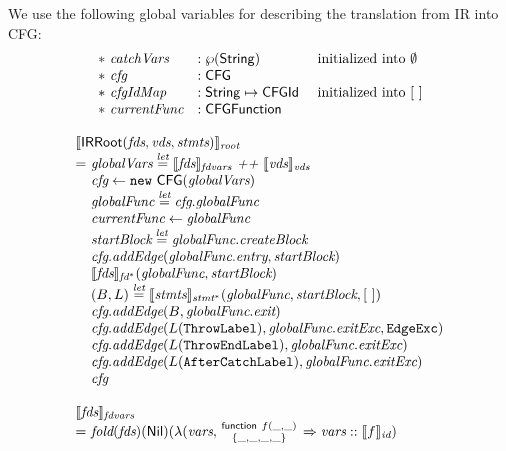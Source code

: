 We use the following global variables for describing the translation from IR into CFG:
\[
\begin{array}{lll}
*\ \emph{catchVars} &: \wp(\mbox{\textsf{String}}) & \text{ initialized into } \emptyset\\
*\ \emph{cfg} &: \mbox{\textsf{CFG}} &\\
*\ \emph{cfgIdMap} &: \mbox{\textsf{String}} \mapsto \mbox{\textsf{CFGId}} & \text{ initialized into } [\ ]\\
*\ \emph{currentFunc} &: \mbox{\textsf{CFGFunction}} & \\
\end{array}
\]

\[
\begin{array}{l@{}l@{~}l}
\lefteqn{\transfun{\IRRoot(\emph{fds}, \emph{vds}, \emph{stmts})}_{\emph{root}}}\\
& = & \emph{globalVars} \letval \transfun{\emph{fds}}_{\emph{fdvars}} ~\emph{++}~ \transfun{\emph{vds}}_{\emph{vds}} \\
& & \emph{cfg} \leftarrow \new\ \CFG(\emph{globalVars})\\
& & \emph{globalFunc} \letval \emph{cfg}.\emph{globalFunc}\\
& & \emph{currentFunc} \leftarrow \emph{globalFunc}\\
& & \emph{startBlock} \letval \emph{globalFunc}.\emph{createBlock}\\
& & \emph{cfg}.\emph{addEdge}(\emph{globalFunc}.\emph{entry}, \emph{startBlock})\\
& & \transfun{\emph{fds}}_{\emph{fd}^*}(\emph{globalFunc}, \emph{startBlock})\\
& & (B, L) \letval \transfun{\emph{stmts}}_{\emph{stmt}^{*}}(\emph{globalFunc}, \emph{startBlock}, [\ ])\\
& & \emph{cfg}.\emph{addEdge}(B, \emph{globalFunc}.\emph{exit})\\
& & \emph{cfg}.\emph{addEdge}(L(\TT{ThrowLabel}), \emph{globalFunc}.\emph{exitExc}, \EdgeExc)\\
& & \emph{cfg}.\emph{addEdge}(L(\TT{ThrowEndLabel}), \emph{globalFunc}.\emph{exitExc})\\
& & \emph{cfg}.\emph{addEdge}(L(\TT{AfterCatchLabel}), \emph{globalFunc}.\emph{exitExc})\\
& & \emph{cfg}\\
& & \\
\lefteqn{\transfun{\emph{fds}}_{\emph{fdvars}}}\\
 & = &
\fold(\emph{fds})(\Nil)(\lambda(\emph{vars}, \irfundeclsmall{f}{\_}{\_}{\_}{\_}{\_}{\_} \Rightarrow \emph{vars} :: \transfun{f}_{\emph{id}})\\
& & \\


\end{array}\]
